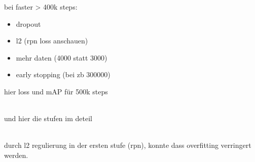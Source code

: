 bei faster > 400k steps:
\begin{itemize}
  \item dropout
  \item l2 (rpn loss anschauen)
  \item mehr daten (4000 statt 3000)
  \item early stopping (bei zb 300000)
\end{itemize}



hier loss und mAP für 500k steps
\\[1cm]
\begin{minipage}{0.5\textwidth}
  \centering
  \label{plot:map}
  \def\svgwidth{0.9\textwidth}
  
\end{minipage}
\begin{minipage}{0.5\textwidth}
  \centering
  \label{plot:loss}
  \def\svgwidth{0.9\textwidth}
  
\end{minipage}
\\[1cm]
und hier die stufen im deteil
\\[1cm]
\begin{minipage}{0.5\textwidth}
  \centering
  \label{plot:map}
  \def\svgwidth{0.9\textwidth}
  
\end{minipage}
\begin{minipage}{0.5\textwidth}
  \centering
  \label{plot:loss}
  \def\svgwidth{0.9\textwidth}
  
\end{minipage}
\\[1cm]
durch l2 regulierung in der ersten stufe (rpn), konnte 
dass overfitting verringert werden.
\\[1cm]
\begin{minipage}{0.5\textwidth}
  \centering
  \label{plot:map}
  \def\svgwidth{0.9\textwidth}
  
\end{minipage}
\begin{minipage}{0.5\textwidth}
  \centering
  \label{plot:loss}
  \def\svgwidth{0.9\textwidth}
  
\end{minipage}
\\[1cm]
